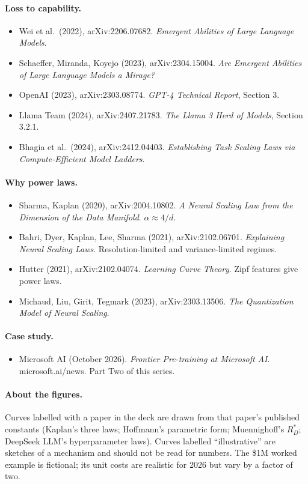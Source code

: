 \documentclass[11pt,letterpaper]{article}
\newcommand{\paper}[1]{\textit{#1}}
\begin{document}
\paragraph{Loss to capability.}
\begin{itemize}
\item Wei et al.\ (2022), arXiv:2206.07682. \paper{Emergent Abilities of Large Language Models}.
\item Schaeffer, Miranda, Koyejo (2023), arXiv:2304.15004. \paper{Are Emergent Abilities of Large Language Models a Mirage?}
\item OpenAI (2023), arXiv:2303.08774. \paper{GPT-4 Technical Report}, Section 3.
\item Llama Team (2024), arXiv:2407.21783. \paper{The Llama 3 Herd of Models}, Section 3.2.1.
\item Bhagia et al.\ (2024), arXiv:2412.04403. \paper{Establishing Task Scaling Laws via Compute-Efficient Model Ladders}.
\end{itemize}

\paragraph{Why power laws.}
\begin{itemize}
\item Sharma, Kaplan (2020), arXiv:2004.10802. \paper{A Neural Scaling Law from the Dimension of the Data Manifold}. $\alpha\approx4/d$.
\item Bahri, Dyer, Kaplan, Lee, Sharma (2021), arXiv:2102.06701. \paper{Explaining Neural Scaling Laws}. Resolution-limited and variance-limited regimes.
\item Hutter (2021), arXiv:2102.04074. \paper{Learning Curve Theory}. Zipf features give power laws.
\item Michaud, Liu, Girit, Tegmark (2023), arXiv:2303.13506. \paper{The Quantization Model of Neural Scaling}.
\end{itemize}

\paragraph{Case study.}
\begin{itemize}
\item Microsoft AI (October 2026). \paper{Frontier Pre-training at Microsoft AI}. microsoft.ai/news. Part Two of this series.
\end{itemize}

\paragraph{About the figures.} Curves labelled with a paper in the deck are drawn from that paper's published constants (Kaplan's three laws; Hoffmann's parametric form; Muennighoff's $R_D^*$; DeepSeek LLM's hyperparameter laws). Curves labelled ``illustrative'' are sketches of a mechanism and should not be read for numbers. The \$1M worked example is fictional; its unit costs are realistic for 2026 but vary by a factor of two.
\end{document}
